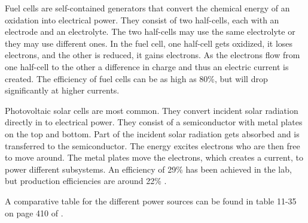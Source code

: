 Fuel cells are self-contained generators that convert the chemical energy of an oxidation into electrical power. They consist of two half-cells, each with an electrode and an electrolyte. The two half-cells may use the same electrolyte or they may use different ones.
In the fuel cell, one half-cell gets oxidized, it loses electrons, and the other is reduced, it gains electrons. As the electrons flow from
one half-cell to the other a difference in charge and thus an electric current is created.
The efficiency of fuel cells can be as high as 80\%, but will drop significantly at higher currents.

Photovoltaic solar cells are most common. They convert incident solar radiation directly in to electrical power. They consist of a semiconductor with metal plates on the top and bottom. Part of the incident solar radiation gets absorbed and is transferred to the
semiconductor. The energy excites electrons who are then free to move around. The metal plates move the electrons, which creates a current,
to power different subsystems. An efficiency of 29\% has been achieved \cite{doody1} in the lab, but production efficiencies are around 22\% \cite{larson}.

A comparative table for the different power sources can be found in table 11-35 on page 410 of \cite{larson}.

